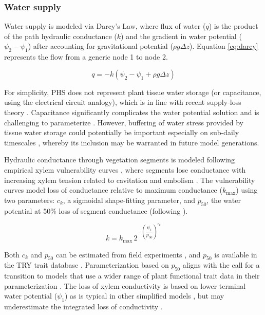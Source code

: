 \documentclass[draft,linenumbers]{agujournal}
\begin{document}
    \subsubsection{Water supply}
    \label{sect:supply}
    Water supply is modeled via Darcy's Law, where flux of water ($q$) is the product of the path hydraulic conductance ($k$) and the gradient in water potential ($\psi_2-\psi_1$) after accounting for gravitational potential ($\rho g \Delta z$).  
    Equation \ref{eq:darcy} represents the flow from a generic node 1 to node 2. 
    
     \begin{linenomath*}
     \begin{equation}
     \label{eq:darcy}
     q = -k\left(\psi_2 - \psi_1 + \rho g \Delta z\right)
     \end{equation}
     \end{linenomath*}
    
    For simplicity, PHS does not represent plant tissue water storage (or capacitance, using the electrical circuit analogy), which is in line with recent supply-loss theory \citep{sperry2015}.  
    Capacitance significantly complicates the water potential solution \citep{celia1990} and is challenging to parameterize \citep{bartlett2016}. 
    However, buffering of water stress provided by tissue water storage could potentially be important especially on sub-daily timescales \citep{meinzer2009,epila2017}, 
    whereby its inclusion may be warranted in future model generations.

     Hydraulic conductance through vegetation segments is modeled following empirical xylem vulnerability curves \citep{tyree1989}, where segments lose conductance with increasing xylem tension related to cavitation and embolism \citep{holbrook2001}.
      The vulnerability curves model loss of conductance relative to maximum conductance ($k_{\text{max}}$) using two parameters: 
      $c_k$, a sigmoidal shape-fitting parameter, and $p_{50}$, the water potential at 50\% loss of segment conductance (following \cite{gentine2016}). 
     
     \begin{linenomath*}
     \begin{equation}
     \label{eq:vulnerability}
     k = k_{\text{max}} \, 2^{-\left(\dfrac{\psi_1}{p_{50}}\right)^{c_k}}
     \end{equation}
     \end{linenomath*}
     
     Both $c_k$ and  $p_{50}$ can be estimated from field experiments \citep{sack2002}, and $p_{50}$ is available in the TRY trait database \citep{kattge2011}. 
     Parameterization based on $p_{50}$ aligns with the call for a transition to models that use a wider range of plant functional trait data in their parameterization \citep{anderegg2015a}. 
     The loss of xylem conductivity is based on lower terminal water potential ($\psi_1$) as is typical in other simplified models \citep{xu2016}, but 
     may underestimate the integrated loss of conductivity \citep{sperry2015}. 
         
\end{document}
